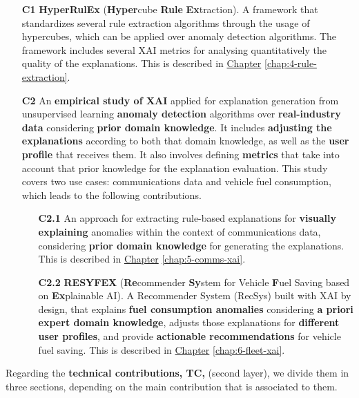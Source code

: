 \begin{itemize}
\item[\textbf{C1 }] \textbf{HyperRulEx} (\textbf{Hyper}cube \textbf{Rule} \textbf{Ex}traction). A framework that standardizes several rule extraction algorithms through the usage of hypercubes, which can be applied over anomaly detection algorithms. The framework includes several XAI metrics for analysing quantitatively the quality of the explanations. This is described in \hyperref[chap:4-rule-extraction]{Chapter} \ref{chap:4-rule-extraction}.

\item[\textbf{C2 }] An \textbf{empirical study of XAI} applied for explanation generation from unsupervised learning \textbf{anomaly detection} algorithms over \textbf{real-industry data} considering \textbf{prior domain knowledge}. It includes \textbf{adjusting the explanations} according to both that domain knowledge, as well as the \textbf{user profile} that receives them. It also involves defining \textbf{metrics} that take into account that prior knowledge for the explanation evaluation. 
This study covers two use cases: communications data and vehicle fuel consumption, which leads to the following contributions.

    \begin{itemize}
    \item[\textbf{C2.1 }] An approach for extracting rule-based explanations for \textbf{visually explaining} anomalies within the context of communications data, considering \textbf{prior domain knowledge} for generating the explanations. This is described in \hyperref[chap:5-comms-xai]{Chapter} \ref{chap:5-comms-xai}.
    
    \item[\textbf{C2.2 }] \textbf{RESYFEX} (\textbf{Re}commender \textbf{Sy}stem for Vehicle \textbf{F}uel Saving based on \textbf{Ex}plainable AI). A Recommender System (RecSys) built with XAI by design, that explains \textbf{fuel consumption anomalies} considering \textbf{a priori expert domain knowledge}, adjusts those explanations for \textbf{different user profiles}, and provide \textbf{actionable recommendations} for vehicle fuel saving.  This is described in \hyperref[chap:6-fleet-xai]{Chapter} \ref{chap:6-fleet-xai}.
    
    \end{itemize}
\end{itemize}

Regarding the \textbf{technical contributions, TC,} (second layer), we divide them in three sections, depending on the main contribution that is associated to them.

